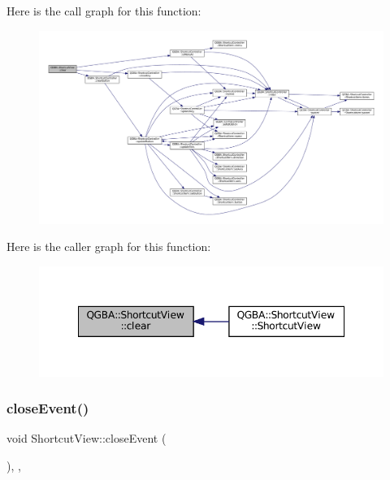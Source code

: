 Here is the call graph for this function\+:
\nopagebreak
\begin{figure}[H]
\begin{center}
\leavevmode
\includegraphics[width=350pt]{class_q_g_b_a_1_1_shortcut_view_af2ed13e937f86700eb78e616e04b706f_cgraph}
\end{center}
\end{figure}
Here is the caller graph for this function\+:
\nopagebreak
\begin{figure}[H]
\begin{center}
\leavevmode
\includegraphics[width=348pt]{class_q_g_b_a_1_1_shortcut_view_af2ed13e937f86700eb78e616e04b706f_icgraph}
\end{center}
\end{figure}
\mbox{\label{class_q_g_b_a_1_1_shortcut_view_a228fca2c7dc1503552ea59fe6ea8c5ed}} 
\subsubsection{\texorpdfstring{close\+Event()}{closeEvent()}}
{\footnotesize\ttfamily void Shortcut\+View\+::close\+Event (\begin{DoxyParamCaption}\item[{Q\+Close\+Event $\ast$}]{ }\end{DoxyParamCaption})\hspace{0.3cm}{\ttfamily [override]}, {\ttfamily [protected]}, {\ttfamily [virtual]}}


